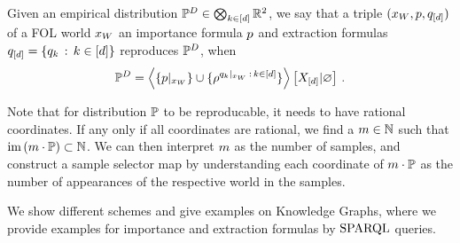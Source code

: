 \begin{definition}
    Given an empirical distribution $\mathbb{P}^{D}\in\bigotimes_{k\in[d]}\mathbb{R}^2$, we say that a triple $(x_{W},p,q_{[d]})$ of a FOL world $x_{W}$ an importance formula $p$ and extraction formulas $q_{[d]}=\{q_{k}\,:\,k\in[d]\}$ reproduces $\mathbb{P}^{D}$, when
    \begin{align*}
        \mathbb{P}^{D}
        = \left\langle \{{p}|_{x_{W}}\}\cup\{\rho^{{q_{k}}|_{x_{W}}\, : \, k\in[d]}\}\right\rangle \left[ X_{[d]} | \varnothing \right] \, .
    \end{align*}
\end{definition}

Note that for distribution $\mathbb{P}$ to be reproducable, it needs to have rational coordinates. %
If any only if all coordinates are rational, we find a $m\in\mathbb{N}$ such that $\mathrm{im}\left(m\cdot\mathbb{P}\right)\subset\mathbb{N}$.
We can then interpret $m$ as the number of samples, and construct a sample selector map by understanding each coordinate of $m\cdot\mathbb{P}$ as the number of appearances of the respective world in the samples.

We show different schemes and give examples on Knowledge Graphs, where we provide examples for importance and extraction formulas by $\mathrm{SPARQL}$ queries.


%



%

